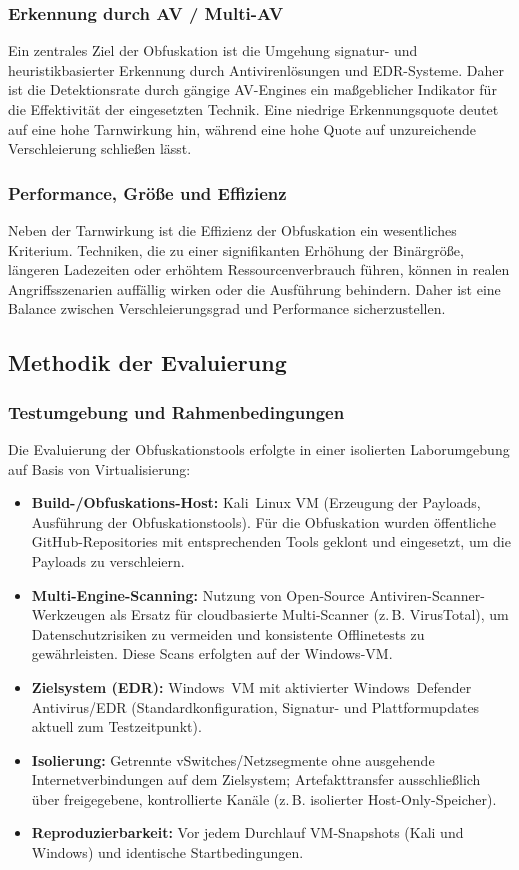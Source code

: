 \subsubsection{Erkennung durch AV / Multi-AV}
Ein zentrales Ziel der Obfuskation ist die Umgehung signatur- und heuristikbasierter Erkennung durch Antivirenlösungen und EDR-Systeme. Daher ist die Detektionsrate durch gängige AV-Engines ein maßgeblicher Indikator für die Effektivität der eingesetzten Technik. Eine niedrige Erkennungsquote deutet auf eine hohe Tarnwirkung hin, während eine hohe Quote auf unzureichende Verschleierung schließen lässt.
\subsubsection{Performance, Größe und Effizienz}
Neben der Tarnwirkung ist die Effizienz der Obfuskation ein wesentliches Kriterium. Techniken, die zu einer signifikanten Erhöhung der Binärgröße, längeren Ladezeiten oder erhöhtem Ressourcenverbrauch führen, können in realen Angriffsszenarien auffällig wirken oder die Ausführung behindern. Daher ist eine Balance zwischen Verschleierungsgrad und Performance sicherzustellen.
\subsection{Methodik der Evaluierung}
\subsubsection{Testumgebung und Rahmenbedingungen}
Die Evaluierung der Obfuskationstools erfolgte in einer isolierten Laborumgebung auf Basis von Virtualisierung:
\begin{itemize}
  \item \textbf{Build-/Obfuskations-Host:} Kali~Linux VM (Erzeugung der Payloads, Ausführung der Obfuskationstools). Für die Obfuskation wurden öffentliche GitHub-Repositories mit entsprechenden Tools geklont und eingesetzt, um die Payloads zu verschleiern.
  \item \textbf{Multi-Engine-Scanning:} Nutzung von Open-Source Antiviren-Scanner-Werkzeugen als Ersatz für cloudbasierte Multi-Scanner (z.\,B. VirusTotal), um Datenschutzrisiken zu vermeiden und konsistente Offlinetests zu gewährleisten. Diese Scans erfolgten auf der Windows-VM.
  \item \textbf{Zielsystem (EDR):} Windows~VM mit aktivierter Windows~Defender Antivirus/EDR (Standardkonfiguration, Signatur- und Plattformupdates aktuell zum Testzeitpunkt).
  \item \textbf{Isolierung:} Getrennte vSwitches/Netzsegmente ohne ausgehende Internetverbindungen auf dem Zielsystem; Artefakttransfer ausschließlich über freigegebene, kontrollierte Kanäle (z.\,B. isolierter Host-Only-Speicher).
  \item \textbf{Reproduzierbarkeit:} Vor jedem Durchlauf VM-Snapshots (Kali und Windows) und identische Startbedingungen.
\end{itemize}
